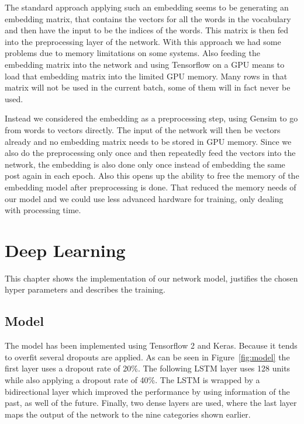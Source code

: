 \documentclass[11pt,a4paper]{article}
\begin{document}
The standard approach applying such an embedding seems to be generating an embedding matrix, that contains the vectors for all the words in the vocabulary and then have the input to be the indices of the words. 
This matrix is then fed into the preprocessing layer of the network. With this approach we had some problems due to memory limitations on some systems. 
Also feeding the embedding matrix into the network and using Tensorflow on a GPU means to load that embedding matrix into the limited GPU memory. 
Many rows in that matrix will not be used in the current batch, some of them will in fact never be used.

Instead we considered the embedding as a preprocessing step, using Gensim to go from words to vectors directly.
The input of the network will then be vectors already and no embedding matrix needs to be stored in GPU memory.
Since we also do the preprocessing only once and then repeatedly feed the vectors into the network, the embedding is also done only once instead of embedding the same post again in each epoch.
Also this opens up the ability to free the memory of the embedding model after preprocessing is done.
That reduced the memory needs of our model and we could use less advanced hardware for training, only dealing with processing time.


\section{Deep Learning}

This chapter shows the implementation of our network model, justifies the chosen hyper parameters and describes the training.


\subsection{Model}
The model has been implemented using Tensorflow 2 and Keras. Because it tends to overfit several dropouts are applied. As can be seen in Figure~\ref{fig:model} the first layer uses a dropout rate of 20\%. The following LSTM layer uses 128 units while also applying a dropout rate of 40\%. The LSTM is wrapped by a bidirectional layer which improved the performance by using information of the past, as well of the future. Finally, two dense layers are used, where the last layer maps the output of the network to the nine categories shown earlier.
\end{document}
